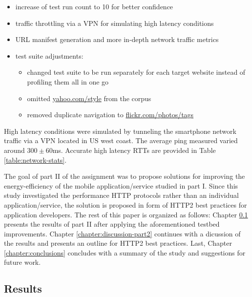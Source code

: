 \documentclass{article}
\begin{document}
\begin{itemize}
    \item increase of test run count to 10 for better confidence
    \item traffic throttling via a VPN for simulating high latency conditions
    \item URL manifest generation and more in-depth network traffic metrics
    \item test suite adjustments:
        \begin{itemize}
        \item changed test suite to be run separately for each target website instead of profiling them all in one go
        \item omitted \url{yahoo.com/style} from the corpus
        \item removed duplicate navigation to \url{flickr.com/photos/tags}
        \end{itemize}
\end{itemize}

High latency conditions were simulated by tunneling the smartphone network traffic via a VPN located in US west coast. The average ping measured varied around $300\pm60$ms. Accurate high latency RTTs are provided in Table \ref{table:network-stats}.

The goal of part II of the assignment was to propose solutions for improving the energy-efficiency of the mobile application/service studied in part I. Since this study investigated the performance HTTP protocols rather than an individual application/service, the solution is proposed in form of HTTP2 best practices for application developers. The rest of this paper is organized as follows: Chapter \ref{chapter:results-part2} presents the results of part II after applying the aforementioned testbed improvements. Chapter \ref{chapter:discussion-part2} continues with a dicussion of the results and presents an outline for HTTP2 best practices. Last, Chapter \ref{chapter:conclusions} concludes with a summary of the study and suggestions for future work.

\subsection{Results}
\label{chapter:results-part2}
\end{document}
